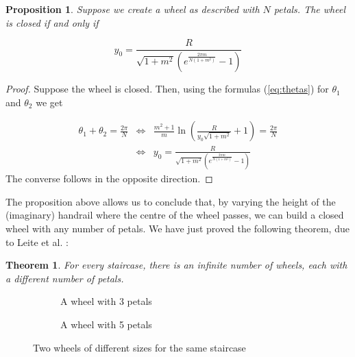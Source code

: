 \documentclass{article}
\theoremstyle{theorem}
\newtheorem{prop}{Proposition}[section]
\theoremstyle{theorem}
\newtheorem{thm}{Theorem}[section]
\begin{document}
\begin{prop}
  Suppose we create a wheel as described with $N$ petals. The wheel is
  closed if and only if

  \begin{equation}
    \label{eq:y0}
    y_0=\frac{R}{\sqrt{1+m^2}\left(e^{\frac{2\pi m}{N(1+m^2)}}-1\right)}
  \end{equation}

\end{prop}

\begin{proof}
  Suppose the wheel is closed. Then, using the formulas
  (\ref{eq:thetas}) for $\theta_1$ and $\theta_2$ we get

  \begin{equation}
    \begin{array}{lcl}
      \theta_1+\theta_2=\frac{2\pi}{N} & \Leftrightarrow &
      \frac{m^2+1}{m}
      \ln\left(\frac{R}{y_0\sqrt{1+m^2}}+1\right)=\frac{2\pi}{N} \\
      & \Leftrightarrow
      & y_0=\frac{R}{\sqrt{1+m^2}\left(e^{\frac{2\pi
              m}{N(1+m^2)}}-1\right)}
    \end{array}
  \end{equation}
  The converse follows in the opposite direction.
\end{proof}

The proposition above allows us to conclude that, by varying the
height of the (imaginary) handrail where the centre of the wheel
passes, we can build a closed wheel with any number of petals. We have
just proved the following theorem, due to Leite et al. \cite{leite}:

\begin{thm}
  For every staircase, there is an infinite number of wheels, each
  with a different number of petals.
\end{thm}

\begin{figure}[h]
  \centering
  \begin{subfigure}[t]{.45\textwidth}
    \centering 
    \caption{A wheel with 3 petals}
    \label{fig:wheel4}
  \end{subfigure}
  \begin{subfigure}[t]{.45\textwidth}
    \centering 
    \caption{A wheel with 5 petals}
    \label{fig:wheel5}
  \end{subfigure}
  \caption{Two wheels of different sizes for the same staircase}
  \label{fig:wheels}
\end{figure}
\end{document}
